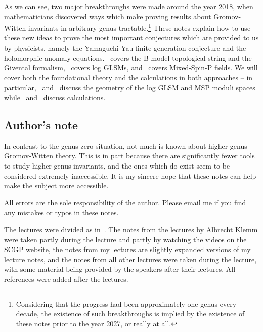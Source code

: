 \documentclass[10pt,oldfontcommands,oneside]{memoir}
\theoremstyle{definition}
\theoremstyle{remark}
\theoremstyle{plain}
\theoremstyle{definition}
\theoremstyle{remark}
\newcommand{\1}{\mathbf{1}}
\newcommand{\2}{\mathbf{2}}
\newcommand{\3}{\mathbf{3}}
\begin{document}
As we can see, two major breakthroughs were made around the year 2018, when mathematicians discovered ways which make proving results about Gromov-Witten invariants in arbitrary genus tractable.\footnote{Considering that the progress had been approximately one genus every decade, the existence of such breakthroughs is implied by the existence of these notes prior to the year 2027, or really at all.} These notes explain how to use these new ideas to prove the most important conjectures which are provided to us by physicists, namely the Yamaguchi-Yau finite generation conjecture and the holomorphic anomaly equations.~ covers the B-model topological string and the Givental formalism,~ covers log GLSMs, and~ covers Mixed-Spin-P fields. We will cover both the foundational theory and the calculations in both approaches -- in particular,~ and~ discuss the geometry of the log GLSM and MSP moduli spaces while~ and~ discuss calculations. 

\subsection*{Author's note}%
\label{sub:Disclaimer}

In contrast to the genus zero situation, not much is known about higher-genus Gromov-Witten theory. This is in part because there are significantly fewer tools to study higher-genus invariants, and the ones which do exist seem to be considered extremely inaccessible. It is my sincere hope that these notes can help make the subject more accessible. 

All errors are the sole responsibility of the author. Please email me if you find any mistakes or typos in these notes.

The lectures were divided as in~. The notes from the lectures by Albrecht Klemm were taken partly during the lecture and partly by watching the videos on the SCGP website, the notes from my lectures are slightly expanded versions of my lecture notes, and the notes from all other lectures were taken during the lecture, with some material being provided by the speakers after their lectures. All references were added after the lectures.
\end{document}
